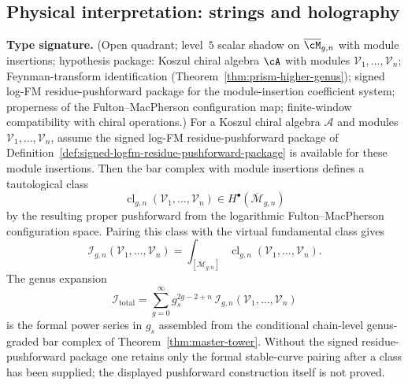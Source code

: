 
\subsection{Physical interpretation: strings and holography}\label{subsec:physics}

\begin{theorem}\label{thm:bar-moduli-integrals}
\textbf{Type signature.} (Open quadrant; level~$5$ scalar shadow on
$\overline{\cM}_{g,n}$ with module insertions; hypothesis package:
Koszul chiral algebra $\cA$ with modules
$\mathcal{V}_1,\ldots,\mathcal{V}_n$; Feynman-transform identification
\textup{(}Theorem~\textup{\ref{thm:prism-higher-genus}}\textup{)};
signed log-FM residue-pushforward package for the module-insertion
coefficient system; properness of the Fulton--MacPherson configuration
map; finite-window compatibility with chiral operations.)
For a Koszul chiral algebra $\mathcal{A}$ and modules
$\mathcal{V}_1,\ldots,\mathcal{V}_n$, assume the signed log-FM
residue-pushforward package of
Definition~\ref{def:signed-logfm-residue-pushforward-package} is
available for these module insertions. Then the bar complex with module
insertions defines a tautological class
\[
\operatorname{cl}_{g,n}(\mathcal{V}_1,\ldots,\mathcal{V}_n)
\in H^\bullet(\overline{\mathcal{M}}_{g,n})
\]
by the resulting proper pushforward from the logarithmic
Fulton--MacPherson configuration space.  Pairing this class with the
virtual fundamental class gives
\[
\mathcal{I}_{g,n}(\mathcal{V}_1,\ldots,\mathcal{V}_n)
=
\int_{[\overline{\mathcal{M}}_{g,n}]}
\operatorname{cl}_{g,n}(\mathcal{V}_1,\ldots,\mathcal{V}_n).
\]
The genus expansion
\[\mathcal{I}_{\mathrm{total}} = \sum_{g=0}^\infty g_s^{2g-2+n}\, \mathcal{I}_{g,n}(\mathcal{V}_1,\ldots,\mathcal{V}_n)\]
is the formal power series in $g_s$ assembled from the conditional
chain-level genus-graded bar complex of Theorem~\ref{thm:master-tower}.
Without the signed residue-pushforward package one retains only the
formal stable-curve pairing after a class has been supplied; the
displayed pushforward construction itself is not proved.
\end{theorem}

